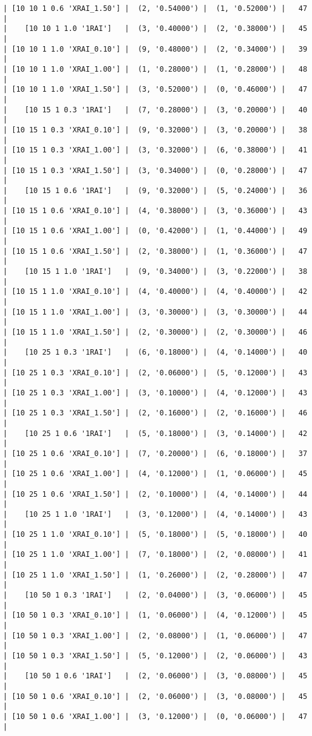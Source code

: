 \documentclass{article}
\begin{document}
\begin{verbatim}
| [10 10 1 0.6 'XRAI_1.50'] |  (2, '0.54000') |  (1, '0.52000') |   47  |
|    [10 10 1 1.0 '1RAI']   |  (3, '0.40000') |  (2, '0.38000') |   45  |
| [10 10 1 1.0 'XRAI_0.10'] |  (9, '0.48000') |  (2, '0.34000') |   39  |
| [10 10 1 1.0 'XRAI_1.00'] |  (1, '0.28000') |  (1, '0.28000') |   48  |
| [10 10 1 1.0 'XRAI_1.50'] |  (3, '0.52000') |  (0, '0.46000') |   47  |
|    [10 15 1 0.3 '1RAI']   |  (7, '0.28000') |  (3, '0.20000') |   40  |
| [10 15 1 0.3 'XRAI_0.10'] |  (9, '0.32000') |  (3, '0.20000') |   38  |
| [10 15 1 0.3 'XRAI_1.00'] |  (3, '0.32000') |  (6, '0.38000') |   41  |
| [10 15 1 0.3 'XRAI_1.50'] |  (3, '0.34000') |  (0, '0.28000') |   47  |
|    [10 15 1 0.6 '1RAI']   |  (9, '0.32000') |  (5, '0.24000') |   36  |
| [10 15 1 0.6 'XRAI_0.10'] |  (4, '0.38000') |  (3, '0.36000') |   43  |
| [10 15 1 0.6 'XRAI_1.00'] |  (0, '0.42000') |  (1, '0.44000') |   49  |
| [10 15 1 0.6 'XRAI_1.50'] |  (2, '0.38000') |  (1, '0.36000') |   47  |
|    [10 15 1 1.0 '1RAI']   |  (9, '0.34000') |  (3, '0.22000') |   38  |
| [10 15 1 1.0 'XRAI_0.10'] |  (4, '0.40000') |  (4, '0.40000') |   42  |
| [10 15 1 1.0 'XRAI_1.00'] |  (3, '0.30000') |  (3, '0.30000') |   44  |
| [10 15 1 1.0 'XRAI_1.50'] |  (2, '0.30000') |  (2, '0.30000') |   46  |
|    [10 25 1 0.3 '1RAI']   |  (6, '0.18000') |  (4, '0.14000') |   40  |
| [10 25 1 0.3 'XRAI_0.10'] |  (2, '0.06000') |  (5, '0.12000') |   43  |
| [10 25 1 0.3 'XRAI_1.00'] |  (3, '0.10000') |  (4, '0.12000') |   43  |
| [10 25 1 0.3 'XRAI_1.50'] |  (2, '0.16000') |  (2, '0.16000') |   46  |
|    [10 25 1 0.6 '1RAI']   |  (5, '0.18000') |  (3, '0.14000') |   42  |
| [10 25 1 0.6 'XRAI_0.10'] |  (7, '0.20000') |  (6, '0.18000') |   37  |
| [10 25 1 0.6 'XRAI_1.00'] |  (4, '0.12000') |  (1, '0.06000') |   45  |
| [10 25 1 0.6 'XRAI_1.50'] |  (2, '0.10000') |  (4, '0.14000') |   44  |
|    [10 25 1 1.0 '1RAI']   |  (3, '0.12000') |  (4, '0.14000') |   43  |
| [10 25 1 1.0 'XRAI_0.10'] |  (5, '0.18000') |  (5, '0.18000') |   40  |
| [10 25 1 1.0 'XRAI_1.00'] |  (7, '0.18000') |  (2, '0.08000') |   41  |
| [10 25 1 1.0 'XRAI_1.50'] |  (1, '0.26000') |  (2, '0.28000') |   47  |
|    [10 50 1 0.3 '1RAI']   |  (2, '0.04000') |  (3, '0.06000') |   45  |
| [10 50 1 0.3 'XRAI_0.10'] |  (1, '0.06000') |  (4, '0.12000') |   45  |
| [10 50 1 0.3 'XRAI_1.00'] |  (2, '0.08000') |  (1, '0.06000') |   47  |
| [10 50 1 0.3 'XRAI_1.50'] |  (5, '0.12000') |  (2, '0.06000') |   43  |
|    [10 50 1 0.6 '1RAI']   |  (2, '0.06000') |  (3, '0.08000') |   45  |
| [10 50 1 0.6 'XRAI_0.10'] |  (2, '0.06000') |  (3, '0.08000') |   45  |
| [10 50 1 0.6 'XRAI_1.00'] |  (3, '0.12000') |  (0, '0.06000') |   47  |

\end{verbatim}
\end{document}

